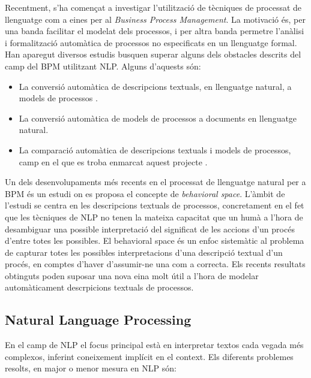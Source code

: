 Recentment, s'ha començat a investigar l'utilització de tècniques de processat de llenguatge com a eines per al \emph{Business Process Management}. La motivació és, per una banda facilitar el modelat dels processos, i per altra banda permetre l'anàlisi i formalització automàtica de processos no especificats en un llenguatge formal. Han aparegut diversos estudis busquen superar alguns dels obstacles descrits del camp del BPM utilitzant NLP. Alguns d'aquests són:

\begin{itemize}
    \item La conversió automàtica de descripcions textuals, en llenguatge natural, a models de processos \cite{text2bpm}.
    \item La conversió automàtica de models de processos a documents en llenguatge natural.
    \item La comparació automàtica de descripcions textuals i models de processos, camp en el que es troba enmarcat aquest projecte \cite{el_paper}.
\end{itemize}

Un dels desenvolupaments més recents en el processat de llenguatge natural per a BPM és un estudi\cite{nou_paper} on es proposa el concepte de \emph{behavioral space}. L'àmbit de l'estudi se centra en les descripcions textuals de processos, concretament en el fet que les tècniques de NLP no tenen la mateixa capacitat que un humà a l'hora de desambiguar una possible interpretació del significat de les accions d'un procés d'entre totes les possibles. El behavioral space és un enfoc sistemàtic al problema de capturar totes les possibles interpretacions d'una descripció textual d'un procés, en comptes d'haver d'assumir-ne una com a correcta. Els recents resultats obtinguts poden suposar una nova eina molt útil a l'hora de modelar automàticament descrpicions textuals de processos.


\subsection{Natural Language Processing}

En el camp de NLP el focus principal està en interpretar textos cada vegada més complexos, inferint coneixement implícit en el context. Els diferents problemes resolts, en major o menor mesura en NLP són\cite{freeling}:

